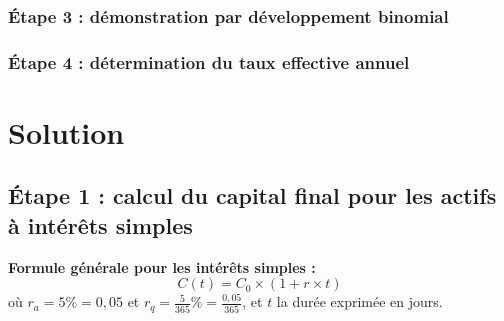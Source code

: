 \documentclass{article}
\begin{document}
\subsubsection*{Étape 3 : démonstration par développement binomial}
\subsubsection*{Étape 4 : détermination du taux effective annuel}


\section{Solution}
\subsection*{Étape 1 : calcul du capital final pour les actifs à intérêts simples}

\noindent
\textbf{Formule générale pour les intérêts simples :}
\[
C(t) = C_0 \times \left(1 + r \times t\right)
\]
où $r_a = 5\% = 0,05$ et \( r_q = \frac{5}{365}\% = \frac{0,05}{365} \), et \( t \) la durée exprimée en jours.
\end{document}
